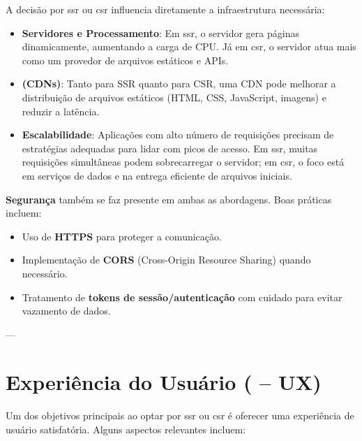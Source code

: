 A decisão por \acrshort{ssr} ou \acrshort{csr} influencia diretamente a infraestrutura necessária:

\begin{itemize}
    \item \textbf{Servidores e Processamento}: Em \acrshort{ssr}, o servidor gera páginas dinamicamente, aumentando a carga de CPU. Já em \acrshort{csr}, o servidor atua mais como um provedor de arquivos estáticos e APIs.
    \item \textbf{ (CDNs)}: Tanto para SSR quanto para CSR, uma CDN pode melhorar a distribuição de arquivos estáticos (HTML, CSS, JavaScript, imagens) e reduzir a latência.
    \item \textbf{Escalabilidade}: Aplicações com alto número de requisições precisam de estratégias adequadas para lidar com picos de acesso. Em \acrshort{ssr}, muitas requisições simultâneas podem sobrecarregar o servidor; em \acrshort{csr}, o foco está em serviços de dados e na entrega eficiente de arquivos iniciais.
\end{itemize}

\textbf{Segurança} também se faz presente em ambas as abordagens. Boas práticas incluem:
\begin{itemize}
    \item Uso de \textbf{HTTPS} para proteger a comunicação.
    \item Implementação de \textbf{CORS} (Cross-Origin Resource Sharing) quando necessário.
    \item Tratamento de \textbf{tokens de sessão/autenticação} com cuidado para evitar vazamento de dados.
\end{itemize}

---

\section{Experiência do Usuário ( – UX)}
\label{sec:ux}
Um dos objetivos principais ao optar por \acrshort{ssr} ou \acrshort{csr} é oferecer uma experiência de usuário satisfatória. Alguns aspectos relevantes incluem:

